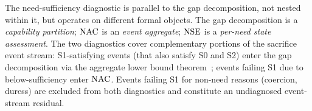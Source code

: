 \begin{remark}
The need-sufficiency diagnostic is parallel to the gap
decomposition, not nested within it, but operates on different
formal objects.  The gap decomposition is a \emph{capability
partition}; $\mathrm{NAC}$ is an \emph{event aggregate}; $\mathrm{NSE}$ is a
\emph{per-need state assessment}.  The two diagnostics cover
complementary portions of the sacrifice event stream:
S1-satisfying events (that also satisfy S0 and S2) enter the gap
decomposition via the aggregate lower bound theorem~\citep[Revealed~Sacrifice]{lasser2026paper8a}; events
failing S1 due to below-sufficiency enter $\mathrm{NAC}$.  Events failing
S1 for non-need reasons (coercion, duress) are excluded from
both diagnostics and constitute an undiagnosed event-stream
residual.
\end{remark}
